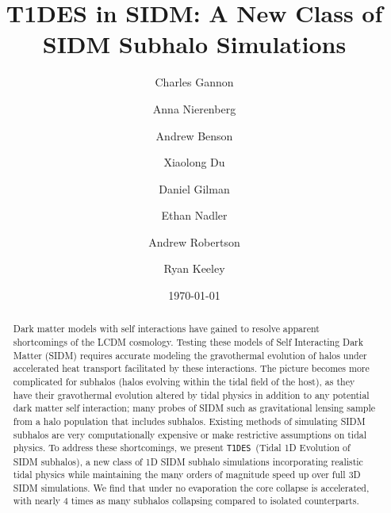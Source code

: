 \documentclass[%
 reprint,
 amsmath,
 amssymb,
 aps,
]{revtex4-2}
\def\tides{{\tt T1DES}~}
\begin{document}

\title{T1DES in SIDM: A New Class of SIDM Subhalo Simulations}%

\author{Charles Gannon}
\author{Anna Nierenberg}
\author{Andrew Benson}
\author{Xiaolong Du}
\author{Daniel Gilman}
\author{Ethan Nadler}
\author{Andrew Robertson}
\author{Ryan Keeley}


\date{\today}%

\begin{abstract}
Dark matter models with self interactions have gained to resolve apparent shortcomings of the LCDM cosmology.
Testing these models of Self Interacting Dark Matter (SIDM) requires accurate modeling the gravothermal evolution of halos under accelerated heat transport facilitated by these interactions.
The picture becomes more complicated for subhalos (halos evolving within the tidal field of the host), as they have their gravothermal evolution altered by tidal physics in addition to any potential dark matter self interaction; many probes of SIDM such as gravitational lensing sample from a halo population that includes subhalos. 
Existing methods of simulating SIDM subhalos are very computationally expensive or make restrictive assumptions on tidal physics.
To address these shortcomings, we present \tides (Tidal 1D Evolution of SIDM subhalos), a new class of 1D SIDM subhalo simulations incorporating realistic tidal physics while maintaining the many orders of magnitude speed up over full 3D SIDM simulations.
We find that under no evaporation the core collapse is accelerated, with nearly $4$ times as many subhalos collapsing compared to isolated counterparts.

\end{abstract}
\end{document}
